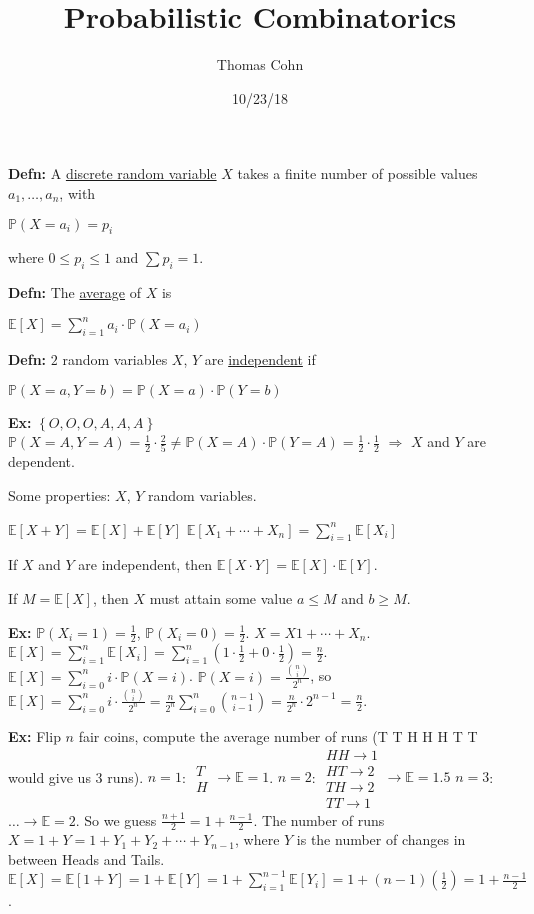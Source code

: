 \documentclass[10pt,letterpaper]{article}
\author{Thomas Cohn}
\title{Probabilistic Combinatorics}
\date{10/23/18} %
\newcommand{\n}{\hfill\break}
\newcommand{\defn}[1]{\par\noindent\settowidth{\hangindent}{\textbf{Defn: }}\textbf{Defn: }#1\n}
\newcommand{\ex}[1]{\par\noindent\settowidth{\hangindent}{\textbf{Ex: }}\textbf{Ex: }#1\n}
\newcommand{\inlineeq}[1]{\centerline{$\displaystyle #1$}}
\newcommand{\set}[1]{\left\{#1\right\}}
\newcommand{\Prob}{\mathbb{P}}
\newcommand{\Avg}[1]{\mathbb{E}\left[#1\right]}
\begin{document}
\maketitle
\setlength\RaggedRightParindent{\parindent}
\RaggedRight

\defn{A \underline{discrete random variable} $X$ takes a finite number of possible values $a_{1},\ldots,a_{n}$, with\n
\inlineeq{\Prob(X=a_{i})=p_{i}}
where $0\le{}p_{i}\le{}1$ and $\sum{}p_{i}=1$.}

\defn{The \underline{average} of $X$ is\n
\inlineeq{\Avg{X}=\sum_{i=1}^{n}a_{i}\cdot\Prob(X=a_{i})}}

\defn{$2$ random variables $X$, $Y$ are \underline{independent} if\n
\inlineeq{\Prob(X=a,Y=b)=\Prob(X=a)\cdot\Prob(Y=b)}}

\ex{$\set{O,O,O,A,A,A}$\n
$\Prob(X=A,Y=A)=\frac{1}{2}\cdot\frac{2}{5}\ne\Prob(X=A)\cdot\Prob(Y=A)=\frac{1}{2}\cdot\frac{1}{2}$\n
$\Rightarrow$ $X$ and $Y$ are dependent.}

\par\noindent Some properties:\n
$X$, $Y$ random variables.\n

\par\noindent $\Avg{X+Y}=\Avg{X}+\Avg{Y}$\n
$\displaystyle\Avg{X_{1}+\cdots+X_{n}}=\sum_{i=1}^{n}\Avg{X_{i}}$\n

\par\noindent If $X$ and $Y$ are independent, then\n
$\Avg{X\cdot{}Y}=\Avg{X}\cdot\Avg{Y}$.\n

\par\noindent If $M=\Avg{X}$, then $X$ must attain some value $a\le{}M$ and $b\ge{}M$.\n

\ex{$\Prob(X_{i}=1)=\frac{1}{2}$, $\Prob(X_{i}=0)=\frac{1}{2}$.\n
$X=X{1}+\cdots+X_{n}$.\n
$\displaystyle\Avg{X}=\sum_{i=1}^{n}\Avg{X_{i}}=\sum_{i=1}^{n}\left(1\cdot\frac{1}{2}+0\cdot\frac{1}{2}\right)=\frac{n}{2}$.\n
$\displaystyle\Avg{X}=\sum_{i=0}^{n}i\cdot\Prob(X=i)$.\n
\n
$\displaystyle\Prob(X=i)=\frac{\binom{n}{i}}{2^{n}}$, so $\displaystyle\Avg{X}=\sum_{i=0}^{n}i\cdot\frac{\binom{n}{i}}{2^{n}}=\frac{n}{2^{n}}\sum_{i=0}^{n}\binom{n-1}{i-1}=\frac{n}{2^{n}}\cdot{}2^{n-1}=\frac{n}{2}$.}

\newpage
\ex{Flip $n$ fair coins, compute the average number of runs (T T H H H T T would give us 3 runs).\n
\n
$n=1$: $\begin{array}{l}T\\ H\end{array}\to\mathbb{E}=1$.\n
$n=2$: $\begin{array}{l}HH\to{}1\\ HT\to{}2\\ TH\to{}2\\ TT\to{}1\end{array}\to\mathbb{E}=1.5$\n
$n=3$: $\ldots\to\mathbb{E}=2$.\n
\n
So we guess $\frac{n+1}{2}=1+\frac{n-1}{2}$.\n
\n
The number of runs $X=1+Y=1+Y_{1}+Y_{2}+\cdots+Y_{n-1}$, where $Y$ is the number of changes in between Heads and Tails.\n
$\displaystyle\Avg{X}=\Avg{1+Y}=1+\Avg{Y}=1+\sum_{i=1}^{n-1}\Avg{Y_{i}}=1+(n-1)(\frac{1}{2})=1+\frac{n-1}{2}$.}
\end{document}
